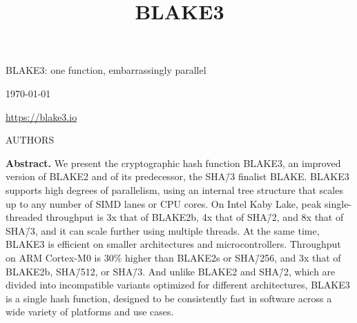 \documentclass[11pt,notitlepage,a4paper]{article}
\title{BLAKE3}
\begin{document}
\selectfont

\pagestyle{plain}

\begin{center}
{\huge BLAKE3: one function, embarrassingly parallel}

\bigskip

\mydate\today 

\medskip

\url{https://blake3.io}

\medskip

AUTHORS
\end{center}


\medskip

\begin{center}
  \begin{minipage}{0.92\linewidth}

      \textbf{Abstract.} We present the cryptographic hash function BLAKE3, an
      improved version of BLAKE2 and of its predecessor, the SHA\=/3 finalist
      BLAKE. BLAKE3 supports high degrees of parallelism, using an internal
      tree structure that scales up to any number of SIMD lanes or CPU cores.
      On Intel Kaby Lake, peak single-threaded throughput is 3x that of
      BLAKE2b, 4x that of SHA\=/2, and 8x that of SHA\=/3, and it can scale
      further using multiple threads. At the same time, BLAKE3 is efficient on
      smaller architectures and microcontrollers. Throughput on ARM Cortex-M0
      is 30\% higher than BLAKE2s or SHA\=/256, and 3x that of BLAKE2b,
      SHA\=/512, or SHA\=/3. And unlike BLAKE2 and SHA\=/2, which are divided
      into incompatible variants optimized for different architectures, BLAKE3
      is a single hash function, designed to be consistently fast in software
      across a wide variety of platforms and use cases.

   \end{minipage}
\end{center}
\end{document}
